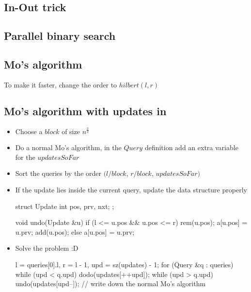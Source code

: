 \subsection{In-Out trick}

\subsection{Parallel binary search}

\subsection{Mo's algorithm}
To make it faster, change the order to $hilbert(l, r)$ \\

\subsection*{Mo's algorithm with updates in  }
  
\begin{itemize}[noitemsep]
  \item Choose a $block$ of size $n^{\frac{2}{3}}$
  \item Do a normal Mo's algorithm, in the $Query$ definition add an extra variable for the $updatesSoFar$ 
  \item Sort the queries by the order $(l /block$, $r / block$, $updatesSoFar)$
  \item If the update lies inside the current query, update the data structure properly \\
  \begin{code}
   struct Update {
     int pos, prv, nxt;
   };
  
   void undo(Update &u) {
     if (l <= u.pos && u.pos <= r) {
       rem(u.pos);
       a[u.pos] = u.prv;
       add(u.pos);
     } else {
       a[u.pos] = u.prv;
     }
   }
  \end{code}
    
  \item Solve the problem :D \\
  \begin{code}
   l = queries[0].l, r = l - 1, upd = sz(updates) - 1;
   for (Query &q : queries) {
     while (upd < q.upd)
       dodo(updates[++upd]);
     while (upd > q.upd)
       undo(updates[upd--]);
     // write down the normal Mo's algorithm
   }
  \end{code}
\end{itemize}

